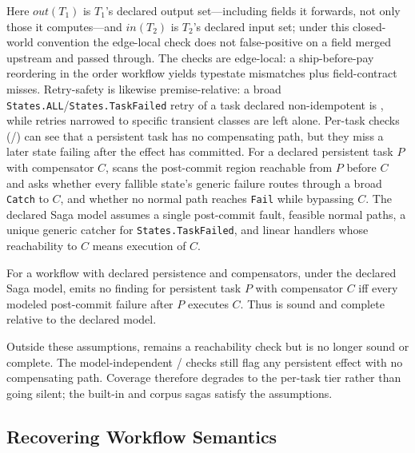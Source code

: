 Here $\mathit{out}(T_1)$ is $T_1$'s declared output set---including fields it forwards, not only
those it computes---and $\mathit{in}(T_2)$ is $T_2$'s declared input set; under this closed-world
convention the edge-local check does not false-positive on a field merged upstream and passed
through. The checks are edge-local: a ship-before-pay reordering in the order workflow yields
typestate mismatches plus field-contract misses. Retry-safety is likewise premise-relative: a broad
\texttt{States.ALL}/\texttt{States.TaskFailed} retry of a task declared non-idempotent is
, while retries narrowed to specific transient classes are left alone.
Per-task checks (/) can see
that a persistent task has no compensating path, but they miss a later state failing after the
effect has committed. For a declared persistent task $P$ with compensator $C$,  scans
the post-commit region reachable from $P$ before $C$ and asks whether every fallible state's generic
failure routes through a broad \texttt{Catch} to $C$, and whether no normal path reaches
\texttt{Fail} while bypassing $C$.
The declared Saga model assumes a single post-commit fault, feasible
normal paths, a unique generic catcher for \texttt{States.TaskFailed},
and linear handlers whose reachability to $C$ means execution of $C$.
\begin{theorem}\label{thm:saga}
For a workflow with declared persistence and compensators, under the declared Saga model,
 emits no finding for persistent task $P$ with compensator $C$ iff every modeled
post-commit failure after $P$ executes $C$. Thus  is sound and complete relative to
the declared model.
\end{theorem}
Outside these assumptions,  remains a reachability check but is no longer sound or
complete. The model-independent / checks still flag any persistent effect
with no compensating path. Coverage therefore degrades to the per-task tier rather than going
silent; the built-in and corpus sagas satisfy the assumptions.

\vspace{-0.25cm}
\subsection{Recovering Workflow Semantics}
\label{sec:approach:annot}
\label{sec:approach:infer}

